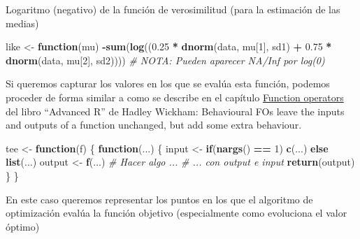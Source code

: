 \documentclass[
]{book}
\newenvironment{Shaded}{\begin{snugshade}}{\end{snugshade}}
\newcommand{\CommentTok}[1]{\textcolor[rgb]{0.56,0.35,0.01}{\textit{#1}}}
\newcommand{\ControlFlowTok}[1]{\textcolor[rgb]{0.13,0.29,0.53}{\textbf{#1}}}
\newcommand{\DecValTok}[1]{\textcolor[rgb]{0.00,0.00,0.81}{#1}}
\newcommand{\FloatTok}[1]{\textcolor[rgb]{0.00,0.00,0.81}{#1}}
\newcommand{\KeywordTok}[1]{\textcolor[rgb]{0.13,0.29,0.53}{\textbf{#1}}}
\newcommand{\NormalTok}[1]{#1}
\newcommand{\OperatorTok}[1]{\textcolor[rgb]{0.81,0.36,0.00}{\textbf{#1}}}
\newcommand{\StringTok}[1]{\textcolor[rgb]{0.31,0.60,0.02}{#1}}
\theoremstyle{break}
\theoremstyle{definition}
\theoremstyle{definition}
\theoremstyle{definition}
\theoremstyle{remark}
\begin{document}
Logaritmo (negativo) de la función de verosimilitud
(para la estimación de las medias)

\begin{Shaded}
\begin{Highlighting}[]
\NormalTok{like <-}\StringTok{ }\ControlFlowTok{function}\NormalTok{(mu)}
  \OperatorTok{-}\KeywordTok{sum}\NormalTok{(}\KeywordTok{log}\NormalTok{((}\FloatTok{0.25} \OperatorTok{*}\StringTok{ }\KeywordTok{dnorm}\NormalTok{(data, mu[}\DecValTok{1}\NormalTok{], sd1) }\OperatorTok{+}\StringTok{ }\FloatTok{0.75} \OperatorTok{*}\StringTok{ }\KeywordTok{dnorm}\NormalTok{(data, mu[}\DecValTok{2}\NormalTok{], sd2))))}
  \CommentTok{# NOTA: Pueden aparecer NA/Inf por log(0)}
\end{Highlighting}
\end{Shaded}

Si queremos capturar los valores en los que se evalúa esta función,
podemos proceder de forma similar a como se describe en el capítulo
\href{http://adv-r.had.co.nz/Function-operators.html\#behavioural-fos}{Function operators}
del libro ``Advanced R'' de Hadley Wickham:
Behavioural FOs leave the inputs and outputs of a function unchanged,
but add some extra behaviour.

\begin{Shaded}
\begin{Highlighting}[]
\NormalTok{tee <-}\StringTok{ }\ControlFlowTok{function}\NormalTok{(f) \{}
  \ControlFlowTok{function}\NormalTok{(...) \{}
\NormalTok{    input <-}\StringTok{ }\ControlFlowTok{if}\NormalTok{(}\KeywordTok{nargs}\NormalTok{() }\OperatorTok{==}\StringTok{ }\DecValTok{1}\NormalTok{) }\KeywordTok{c}\NormalTok{(...) }\ControlFlowTok{else} \KeywordTok{list}\NormalTok{(...)}
\NormalTok{    output <-}\StringTok{ }\KeywordTok{f}\NormalTok{(...)}
    \CommentTok{# Hacer algo ...}
    \CommentTok{# ... con output e input}
    \KeywordTok{return}\NormalTok{(output)}
\NormalTok{  \}}
\NormalTok{\}}
\end{Highlighting}
\end{Shaded}

En este caso queremos representar los puntos en los que el algoritmo de optimización
evalúa la función objetivo (especialmente como evoluciona el valor óptimo)
\end{document}
